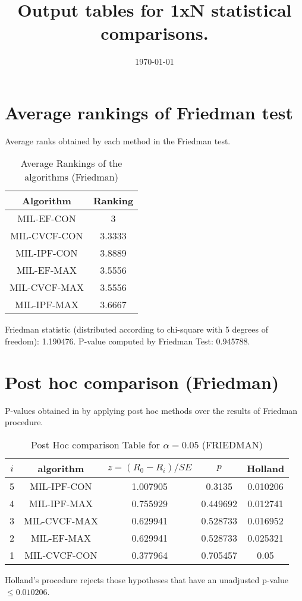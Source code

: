 \documentclass[a4paper,10pt]{article}
\title{Output tables for 1xN statistical comparisons.}
\author{}
\date{\today}
\begin{document}
\begin{landscape}
\pagestyle{empty}
\maketitle
\thispagestyle{empty}

\section{Average rankings of Friedman test}


Average ranks obtained by each method in the Friedman test.

\begin{table}[!htp]
\centering
\begin{tabular}{|c|c|}\hline
Algorithm&Ranking\\\hline
MIL-EF-CON&3\\MIL-CVCF-CON&3.3333\\MIL-IPF-CON&3.8889\\MIL-EF-MAX&3.5556\\MIL-CVCF-MAX&3.5556\\MIL-IPF-MAX&3.6667\\\hline\end{tabular}
\caption{Average Rankings of the algorithms (Friedman)}
\end{table}

Friedman statistic (distributed according to chi-square with 5 degrees of freedom): 1.190476. \newline P-value computed by Friedman Test: 0.945788.\newline


\newpage

\section{Post hoc comparison (Friedman)}


P-values obtained in by applying post hoc methods over the results of Friedman procedure.

\begin{table}[!htp]
\centering\footnotesize
\begin{tabular}{ccccc}
$i$&algorithm&$z=(R_0 - R_i)/SE$&$p$&Holland\\
\hline5&MIL-IPF-CON&1.007905&0.3135&0.010206\\4&MIL-IPF-MAX&0.755929&0.449692&0.012741\\3&MIL-CVCF-MAX&0.629941&0.528733&0.016952\\2&MIL-EF-MAX&0.629941&0.528733&0.025321\\1&MIL-CVCF-CON&0.377964&0.705457&0.05\\\hline
\end{tabular}
\caption{Post Hoc comparison Table for $\alpha=0.05$ (FRIEDMAN)}
\end{table}Holland's procedure rejects those hypotheses that have an unadjusted p-value $\le0.010206$.



\end{landscape}
\end{document}
